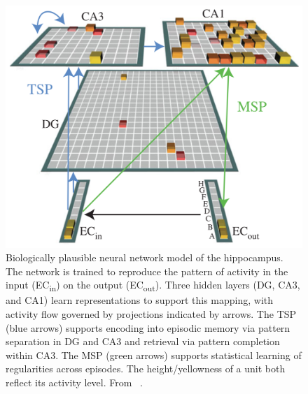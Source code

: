 \setlength{\columnsep}{20pt}
\begin{figure}
\centering
\includegraphics[width=.39\textwidth]{figs/hipp-model}
\caption{\small Biologically plausible neural network model of the
hippocampus. The network is trained to reproduce the pattern of
activity in the input (EC\textsubscript{in}) on the output
(EC\textsubscript{out}). Three hidden layers (DG, CA3, and CA1) learn
representations to support this mapping, with activity flow governed
by projections indicated by arrows. The TSP (blue
arrows) supports encoding into episodic memory via pattern separation
in DG and CA3 and retrieval via pattern completion within CA3. The
MSP (green arrows) supports statistical learning of
regularities across episodes. The height/yellowness of a unit both
reflect its activity level. From ~\citet{Schapiro:2017}.}
    \label{fig:hipp}
    \vskip-10pt
\end{figure}

